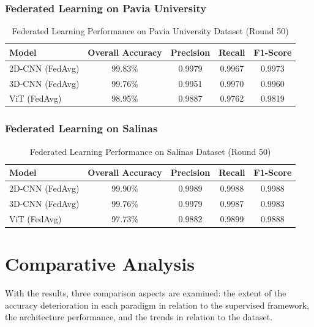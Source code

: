 \subsubsection{Federated Learning on Pavia University}
\begin{table}[H]
    \centering
    \caption{Federated Learning Performance on Pavia University Dataset (Round 50)}
    \label{tab:federated_pavia}
    \renewcommand{\arraystretch}{1.2}
    \begin{tabular}{|l|c|c|c|c|}
        \hline
        \textbf{Model} & \textbf{Overall Accuracy} & \textbf{Precision} & \textbf{Recall} & \textbf{F1-Score} \\ \hline
        2D-CNN (FedAvg) & 99.83\% & 0.9979 & 0.9967 & 0.9973 \\ \hline
        3D-CNN (FedAvg) & 99.76\% & 0.9951 & 0.9970 & 0.9960 \\ \hline
        ViT (FedAvg) & 98.95\% & 0.9887 & 0.9762 & 0.9819 \\ \hline
    \end{tabular}
\end{table}

\subsubsection{Federated Learning on Salinas}
\begin{table}[H]
    \centering
    \caption{Federated Learning Performance on Salinas Dataset (Round 50)}
    \label{tab:federated_salinas}
    \renewcommand{\arraystretch}{1.2}
    \begin{tabular}{|l|c|c|c|c|}
        \hline
        \textbf{Model} & \textbf{Overall Accuracy} & \textbf{Precision} & \textbf{Recall} & \textbf{F1-Score} \\ \hline
        2D-CNN (FedAvg) & 99.90\% & 0.9989 & 0.9988 & 0.9988 \\ \hline
        3D-CNN (FedAvg) & 99.76\% & 0.9979 & 0.9987 & 0.9983 \\ \hline
        ViT (FedAvg) & 97.73\% & 0.9882 & 0.9899 & 0.9888 \\ \hline
    \end{tabular}
\end{table}

\section{Comparative Analysis}
With the results, three comparison aspects are examined: the extent of the accuracy deterioration in each paradigm in relation to the supervised framework, the architecture performance, and the trends in relation to the dataset.

